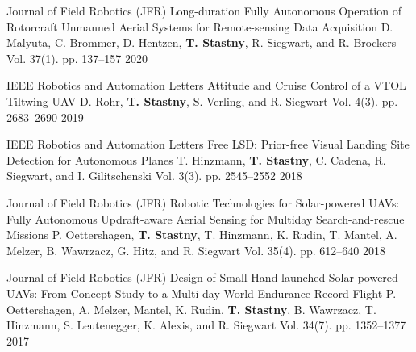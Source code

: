 

\begin{cventries}


\begin{flushleft}
\end{flushleft}

\cvpubentry
	{Journal of Field Robotics (JFR)} %
	{Long-duration Fully Autonomous Operation of Rotorcraft Unmanned Aerial Systems for Remote-sensing Data Acquisition} %
	{D. Malyuta, C. Brommer, D. Hentzen, \textbf{T. Stastny}, R. Siegwart, and R. Brockers} %
	{Vol. 37(1). pp. 137--157} %
	{2020} %
	{} %
	{} %

\cvpubentry
	{IEEE Robotics and Automation Letters} %
	{Attitude and Cruise Control of a VTOL Tiltwing UAV} %
	{D. Rohr, \textbf{T. Stastny}, S. Verling, and R. Siegwart} %
	{Vol. 4(3). pp. 2683--2690} %
	{2019} %
	{} %
	{} %

\cvpubentry
	{IEEE Robotics and Automation Letters} %
	{Free LSD: Prior-free Visual Landing Site Detection for Autonomous Planes} %
	{T. Hinzmann, \textbf{T. Stastny}, C. Cadena, R. Siegwart, and I. Gilitschenski} %
	{Vol. 3(3). pp. 2545--2552} %
	{2018} %
	{} %
	{} %
	
\cvpubentry
	{Journal of Field Robotics (JFR)} %
	{Robotic Technologies for Solar-powered UAVs: Fully Autonomous Updraft-aware Aerial Sensing for Multiday Search-and-rescue Missions} %
	{P. Oettershagen, \textbf{T. Stastny}, T. Hinzmann, K. Rudin, T. Mantel, A. Melzer, B. Wawrzacz, G. Hitz, and R. Siegwart} %
	{Vol. 35(4). pp. 612--640} %
	{2018} %
	{} %
	{} %

\cvpubentry
	{Journal of Field Robotics (JFR)} %
	{Design of Small Hand-launched Solar-powered UAVs: From Concept Study to a Multi-day World Endurance Record Flight} %
	{P. Oettershagen, A. Melzer, Mantel, K. Rudin, \textbf{T. Stastny}, B. Wawrzacz, T. Hinzmann, S. Leutenegger, K. Alexis, and R. Siegwart} %
	{Vol. 34(7). pp. 1352--1377} %
	{2017} %
	{} %
	{} %


\end{cventries}
